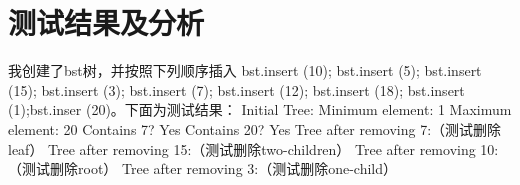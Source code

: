 \documentclass[UTF8]{ctexart}
\begin{document}
\section{测试结果及分析}
我创建了bst树，并按照下列顺序插入    bst.insert (10);
bst.insert (5);
bst.insert (15);
bst.insert (3);
bst.insert (7);
bst.insert (12);
bst.insert (18);
bst.insert (1);bst.inser (20)。下面为测试结果：\newline
Initial Tree:\newline
Minimum element: 1\newline
Maximum element: 20\newline
Contains 7? Yes\newline
Contains 20? Yes\newline
Tree after removing 7:（测试删除leaf）\newline
Tree after removing 15:（测试删除two-children）\newline
Tree after removing 10:（测试删除root）\newline
Tree after removing 3:（测试删除one-child）\newline
\end{document}
